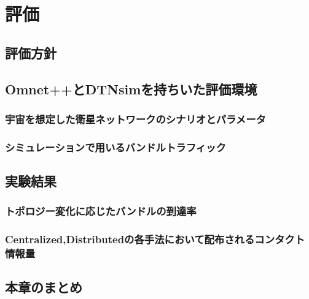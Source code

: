 \chapter{評価}
\label{chap:evaluation}
\section{評価方針}
\section{Omnet++とDTNsimを持ちいた評価環境}
\subsection{宇宙を想定した衛星ネットワークのシナリオとパラメータ}
\subsection{シミュレーションで用いるバンドルトラフィック}
\section{実験結果}
\subsection{トポロジー変化に応じたバンドルの到達率}
\subsection{Centralized,Distributedの各手法において配布されるコンタクト情報量}

\section{本章のまとめ}